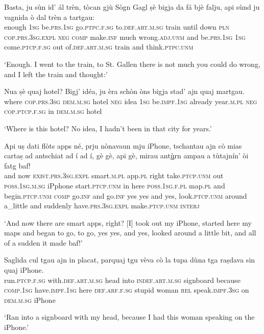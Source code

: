 \begin{linenumbers}
	\gll Basta, ju sùn id’ ál trèn, tòcan gjù Sògn Gagl ṣè bigja da fá bjè falju, api sùnd ju vagnida ò dal trèn a tartgau:   \\
	enough \textsc{1sg} be.\textsc{prs.1sg} go.\textsc{ptpc.f.sg} to.\textsc{def.art.m.sg} train until down \textsc{pln} {} \textsc{cop.prs.3sg.expl} \textsc{neg} \textsc{comp} make.\textsc{inf} much wrong.\textsc{adj.unm} and be.\textsc{prs.1sg} \textsc{1sg} come.\textsc{ptcp.f.sg} out of.\textsc{def.art.m.sg} train and think.\textsc{ptpc.unm}\\
\end{linenumbers}
\medskip
\glt `Enough. I went to the train, to St. Gallen there is not much you could do wrong, and I left the train and thought:'
\medskip

\begin{linenumbers}
	\gll Nua ṣè quaj hotel? Bigj' idéa, ju èra schòn òns bigja stad’ ajn quaj martgau.   \\
	where \textsc{cop.prs.3sg} \textsc{dem.m.sg} hotel \textsc{neg} idea \textsc{1sg} be.\textsc{impf.1sg} already year.\textsc{m.pl} \textsc{neg} \textsc{cop.ptcp.f.sg} in \textsc{dem.m.sg} hotel\\
\end{linenumbers}
\medskip
\glt `Where is this hotel? No idea, I hadn't been in that city for years.'
\medskip

\begin{linenumbers}
	\gll  Api uṣ dati flòts apps né, prju nònavaun mju iPhone, tschantau ajn cò mias cartaṣ ad antschiat ad í ad í, gè gè, api gè, mirau ant\underline{ù}rn ampau a tùtajnín’ òi fatg baf!   \\
	and now \textsc{exist.prs.3sg.expl} smart.\textsc{m.pl} app.\textsc{pl} right take.\textsc{ptcp.unm} out \textsc{poss.1sg.m.sg} iPphone start.\textsc{ptcp.unm} in here \textsc{poss.1sg.f.pl} map.\textsc{pl} and begin.\textsc{ptcp.unm} \textsc{comp} go.\textsc{inf} and go.\textsc{inf} yes yes and yes, look.\textsc{ptcp.unm} around a\_little and suddenly have.\textsc{prs.3sg.expl} make.\textsc{ptcp.unm} \textsc{interj}\\
\end{linenumbers}
\medskip
\glt `And now there are smart apps, right? [I] took out my iPhone, started here my maps and began to go, to go, yes yes, and yes, looked around a little bit, and all of a sudden it made baf!'
\medskip

\begin{linenumbers}
	\gll Saglida cul tgau ajn in placat, parquaj tgu vèva cò la tupa dùna tga raṣdava sin quaj iPhone.\\
	run.\textsc{ptcp.f.sg} with.\textsc{def.art.m.sg} head into \textsc{indef.art.m.sg} signboard because \textsc{comp.1sg} have.\textsc{impf.1sg} here \textsc{def.arf.f.sg} stupid woman \textsc{rel} speak.\textsc{impf.3sg} on \textsc{dem.m.sg} iPhone\\
\end{linenumbers}
\medskip
\glt `Ran into a signboard with my head, because I had this woman speaking on the iPhone.'
\medskip

